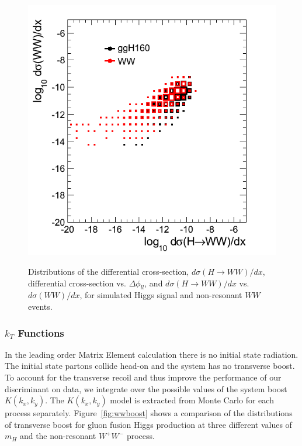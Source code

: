 \documentclass{cmspaper}
\begin{document}
\begin{figure}[!hbtp]
{\includegraphics[width=.42\textwidth]{figures/Xsec_WWvsHWW.png}}\\                                            
\caption{Distributions of  the differential cross-section, $d\sigma(H \rightarrow WW)/dx$, 
 differential cross-section vs. $\Delta\phi_{ll}$, and 
  $d\sigma(H \rightarrow WW)/dx$ vs. $d\sigma(WW)/dx$, 
for simulated Higgs signal and non-resonant $WW$ events.}
\label{fig:dXsecPlots}                                                                                          
\end{figure}                      

\subsubsection{$k_{T}$ Functions} 
In the leading order Matrix Element calculation there is no initial state radiation. The initial state partons 
collide head-on and the system has no transverse boost. To account for the transverse recoil and thus improve the performance 
of our discriminant on data, we integrate over the possible values of the system boost $K(k_x,k_y)$. The $K(k_x,k_y)$ model
is extracted from Monte Carlo for each process separately. Figure~\ref{fig:wwboost} shows a comparison of the distributions
of transverse boost for gluon fusion Higgs production at three different values of $m_H$ and the 
non-resonant $W^{+}W^{-}$ process.
\end{document}
